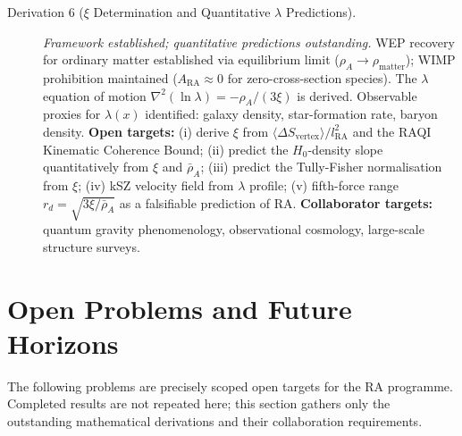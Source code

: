 \documentclass[11pt,a4paper]{article}
\theoremstyle{plain}
\theoremstyle{definition}
\theoremstyle{remark}
\begin{document}
\begin{description}
  \item[Derivation 6 ($\xi$ Determination and Quantitative $\lambda$ Predictions).]
  \textit{Framework established; quantitative predictions outstanding.}
  WEP recovery for ordinary matter established via equilibrium limit
  ($\rho_A \to \rho_{\mathrm{matter}}$); WIMP prohibition maintained
  ($A_{\mathrm{RA}} \approx 0$ for zero-cross-section species).
  The $\lambda$ equation of motion $\nabla^2(\ln\lambda) = -\rho_A/(3\xi)$
  is derived. Observable proxies for $\lambda(x)$ identified:
  galaxy density, star-formation rate, baryon density.
  \textbf{Open targets:} (i) derive $\xi$ from
  $\langle\Delta S_{\mathrm{vertex}}\rangle/l_{\mathrm{RA}}^2$ and the
  RAQI Kinematic Coherence Bound; (ii) predict the $H_0$-density slope
  quantitatively from $\xi$ and $\bar\rho_A$; (iii) predict the
  Tully-Fisher normalisation from $\xi$; (iv) kSZ velocity field from
  $\lambda$ profile; (v) fifth-force range $r_d = \sqrt{3\xi/\bar\rho_A}$
  as a falsifiable prediction of RA.
  \textbf{Collaborator targets:} quantum gravity phenomenology,
  observational cosmology, large-scale structure surveys.
\end{description}



\section{Open Problems and Future Horizons}
\label{sec:openproblems}

The following problems are precisely scoped open targets for the RA programme.
Completed results are not repeated here; this section gathers only the
outstanding mathematical derivations and their collaboration requirements.
\end{document}
